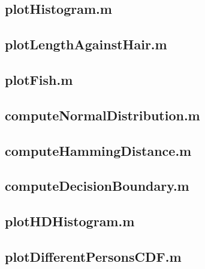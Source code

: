\documentclass[10pt,a4paper]{article}
\begin{document}
\subsection{plotHistogram.m}\label{a:plotHistogram}

\subsection{plotLengthAgainstHair.m}\label{a:plotLengthAgainstHair}

\subsection{plotFish.m}\label{a:plotFish}

\subsection{computeNormalDistribution.m}\label{a:computeND}

\subsection{computeHammingDistance.m}\label{a:computeHD}

\subsection{computeDecisionBoundary.m}\label{a:computeDB}

\subsection{plotHDHistogram.m}\label{a:plotHDHistogram}

\subsection{plotDifferentPersonsCDF.m}\label{a:plotCDF}
\end{document}
